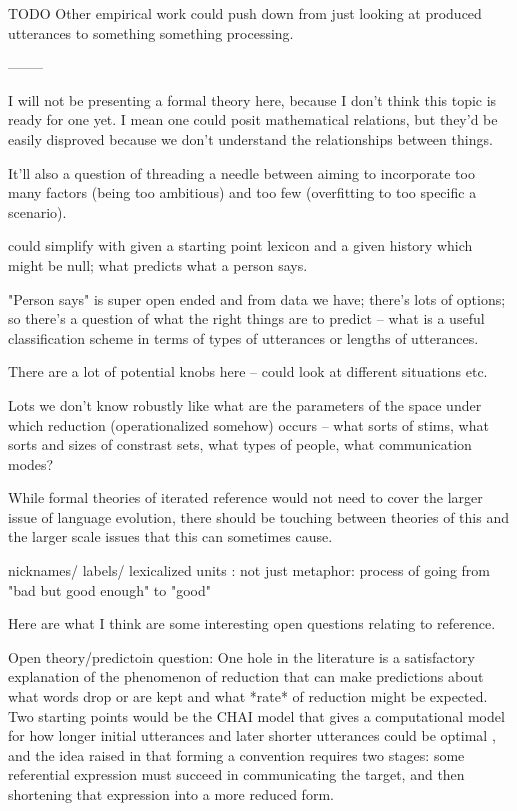 \documentclass[]{article}
\begin{document}
	TODO Other empirical work could push down from just looking at produced utterances to something something processing. 
	
	--------
	
	I will not be presenting a formal theory here, because I don't think this topic is ready for one yet. I mean one could posit mathematical relations, but they'd be easily disproved because we don't understand the relationships between things. 
	
	It'll also a question of threading a needle between aiming to incorporate too many factors (being too ambitious) and too few (overfitting to too specific a scenario). 
	

	could simplify with given a starting point lexicon and a given history which might be null; what predicts what a person says. 
	
	"Person says" is super open ended and from data we have; there's lots of options; so there's a question of what the right things are to predict -- what is a useful classification scheme in terms of types of utterances or lengths of utterances. 
	
	There are a lot of potential knobs here -- could look at different situations etc. 
	
	Lots we don't know robustly like what are the parameters of the space under which reduction (operationalized somehow) occurs -- what sorts of stims, what sorts and sizes of constrast sets, what types of people, what communication modes? 
	
	While formal theories of iterated reference would not need to cover the larger issue of language evolution, there should be touching between theories of this and the larger scale issues that this can sometimes cause. 
	
	
	nicknames/ labels/ lexicalized units : not just metaphor: process of going from "bad but good enough" to "good"
	
	
	Here are what I think are some interesting open questions relating to reference. 
	
	Open theory/predictoin question: One hole in the literature is a satisfactory explanation of the phenomenon of reduction that can make predictions about what words drop or are kept and what *rate* of reduction might be expected. Two starting points would be the CHAI model that gives a computational model for how longer initial utterances and later shorter utterances could be optimal \cite{hawkins2021}, and the idea raised in \cite{leung2023} that forming a convention requires two stages: some referential expression must succeed in communicating the target, and then shortening that expression into a more reduced form.
	
\end{document}
